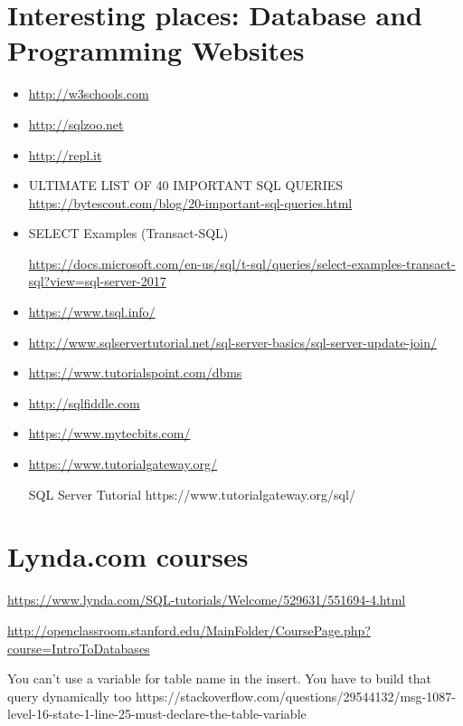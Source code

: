 \newpage
\section  {Interesting places: Database and Programming Websites}

\begin{itemize}
\item \url{http://w3schools.com}
\item \url{http://sqlzoo.net} 
\item \url{http://repl.it} 
\item ULTIMATE LIST OF 40 IMPORTANT SQL QUERIES 
\subitem \url{https://bytescout.com/blog/20-important-sql-queries.html}
\item SELECT Examples (Transact-SQL) 

\subitem \url{https://docs.microsoft.com/en-us/sql/t-sql/queries/select-examples-transact-sql?view=sql-server-2017}

\item \url{https://www.tsql.info/}
\item \url{http://www.sqlservertutorial.net/sql-server-basics/sql-server-update-join/}
\item \url{https://www.tutorialspoint.com/dbms}
\item \url{http://sqlfiddle.com}
\item \url{https://www.mytecbits.com/}
\item \url{https://www.tutorialgateway.org/}

SQL Server Tutorial https://www.tutorialgateway.org/sql/

\end{itemize}

\section  * {Lynda.com courses}
\url{https://www.lynda.com/SQL-tutorials/Welcome/529631/551694-4.html}

\url{http://openclassroom.stanford.edu/MainFolder/CoursePage.php?course=IntroToDatabases}


You can't use a variable for table name in the insert. You have to build that query dynamically too
https://stackoverflow.com/questions/29544132/msg-1087-level-16-state-1-line-25-must-declare-the-table-variable